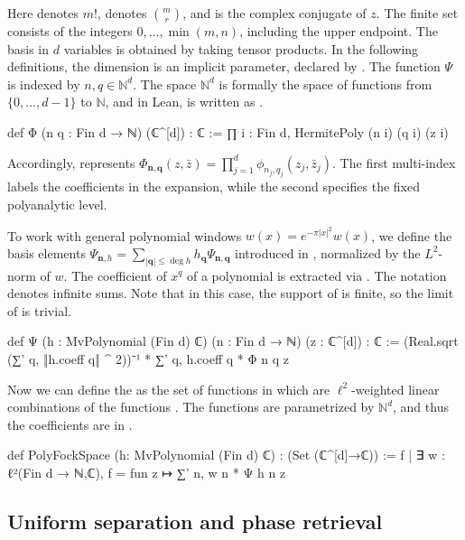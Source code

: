 \documentclass[11pt]{amsart}
\newcommand{\N}{\mathbb N}
\begin{document}
Here  denotes $m!$,  denotes
$\binom mr$, and  is the complex conjugate of $z$.
The finite set  consists of the integers
$0,\ldots,\min(m,n)$, including the upper endpoint. 
The basis in $d$ variables is obtained by taking tensor products. In the
following definitions, the dimension is an implicit parameter, declared by . The function $\Psi$ is indexed by $n,q \in \N^d$. The space $\N^d$ is formally the space of functions from $\{0, \dots, d-1\}$ to $\N$, and in Lean, is written as .

\begin{leancode}
def Φ (n q : Fin d → ℕ) (ℂ^[d]) : ℂ :=
    ∏ i : Fin d, HermitePoly (n i) (q i) (z i)
\end{leancode}

Accordingly,  represents
$\Phi_{\mathbf n,\mathbf q}(z,\bar z)
=\prod_{j=1}^d\phi_{n_j,q_j}(z_j,\bar z_j)$.
The first multi-index labels the coefficients in the expansion, while the
second specifies the fixed polyanalytic level.

To work with general polynomial windows $w(x) = e^{-\pi|x|^2} w(x)$, we define the basis elements $\Psi_{\mathbf n,h} = \sum_{|\mathbf q| \leq \deg h} h_{\mathbf q} \Psi_{\mathbf n,\mathbf q}$ introduced in , normalized by the $L^2$-norm of $w$. The coefficient of $x^q$ of a polynomial  is extracted via . The notation  denotes infinite sums. Note that in this case, the support of  is finite, so the limit of   is trivial.

\begin{leancode}
def Ψ (h : MvPolynomial (Fin d) ℂ) (n : Fin d → ℕ) (z : ℂ^[d]) : ℂ :=
    (Real.sqrt (∑' q, ‖h.coeff q‖ ^ 2))⁻¹ * ∑' q, h.coeff q * Φ n q z
\end{leancode}

Now we can define the  as the set of functions in  which are $\ell^2$-weighted linear combinations of the functions . The functions  are parametrized by $\N^d$, and thus the coefficients are in .

\begin{leancode}
def PolyFockSpace (h: MvPolynomial (Fin d) ℂ) : (Set (ℂ^[d]→ℂ)) := 
    {f | ∃ w : ℓ²(Fin d → ℕ,ℂ), f = fun z ↦ ∑' n,  w n * Ψ h n z}
\end{leancode}

\subsection{Uniform separation and phase retrieval}
\end{document}
